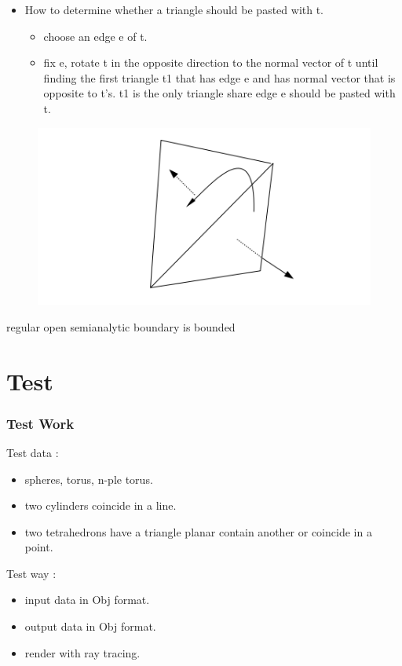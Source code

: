 \documentclass{beamer}
\begin{document}
\begin{frame}
  \begin{itemize}
  \item How to determine whether a triangle should be pasted with t.
  \begin{itemize}
  	\item choose an edge e of t.
  	\item fix e, rotate t in the opposite direction to the normal vector of t until finding the first triangle t1 that has edge e and has normal vector that is opposite to t's. t1 is the only triangle share edge e should be pasted with t.
  \end{itemize}
  \end{itemize}
\begin{figure}
	\includegraphics[scale=0.4]{past.png}
\end{figure}
   \textcolor[rgb]{1,0,0}{regular open} \textcolor[rgb]{1,0,1}{semianalytic} \textcolor[rgb]{0,0,1}{boundary is bounded}
\end{frame}


\section{Test}

\begin{frame}
  \frametitle{Test Work}
  Test data : 
  \begin{itemize}
  \item spheres, torus, n-ple torus. 
    
  \item two cylinders coincide in a line.
    
  \item two tetrahedrons have a triangle planar contain another or coincide in a point.

  \end{itemize}
  Test way : 
  \begin{itemize}
  	\item input data in Obj format.
  	\item output data in Obj format.
  	\item render with ray tracing.
  \end{itemize}
\end{frame}
\end{document}
